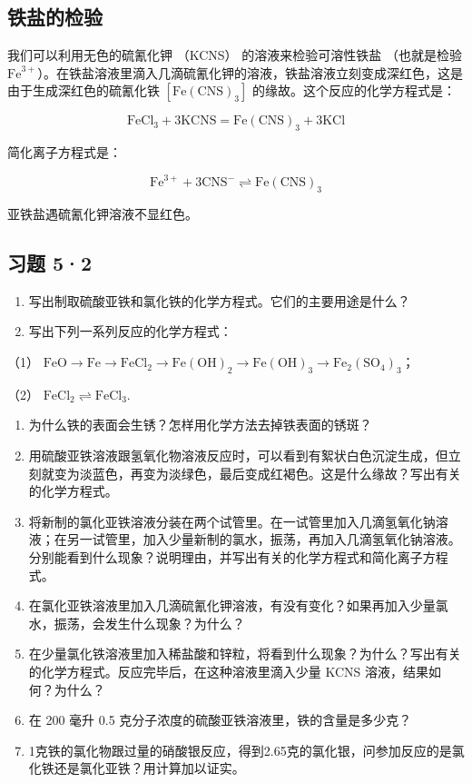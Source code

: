 \subsection{铁盐的检验}

我们可以利用无色的硫氰化钾 （KCNS） 的溶液来检验可溶性铁盐 （也就是检验
\(\mathrm{Fe}^{3+}\)）。在铁盐溶液里滴入几滴硫氰化钾的溶液，铁盐溶液立刻变成深红色，这是由于生成深红色的硫氰化铁
\(\left[\mathrm{Fe}(\mathrm{CNS})_{3}\right]\)
的缘故。这个反应的化学方程式是：

\[
\mathrm{FeCl} _ {3} + 3 \mathrm{KCNS} = \mathrm{Fe} (\mathrm{CNS}) _ {3} + 3 \mathrm{KCl}
\]

简化离子方程式是：

\[
\mathrm{Fe} ^{3+} + 3 \mathrm{CNS} ^ {-} \rightleftharpoons \mathrm{Fe} (\mathrm{CNS}) _ {3}
\]

亚铁盐遇硫氰化钾溶液不显红色。

\subsection{习题 5·2}

\begin{enumerate}
\item
  写出制取硫酸亚铁和氯化铁的化学方程式。它们的主要用途是什么？
\item
  写出下列一系列反应的化学方程式：
\end{enumerate}

（1）
\(\mathrm{FeO} \longrightarrow \mathrm{Fe} \longrightarrow \mathrm{FeCl}_2 \longrightarrow \mathrm{Fe(OH)}_2 \longrightarrow \mathrm{Fe(OH)}_3 \longrightarrow \mathrm{Fe}_2(\mathrm{SO}_4)_3\)；

（2） \(\mathrm{FeCl}_2 \rightleftharpoons \mathrm{FeCl}_3\).

\begin{enumerate}[start=3]
\item
  为什么铁的表面会生锈？怎样用化学方法去掉铁表面的锈斑？
\item
  用硫酸亚铁溶液跟氢氧化物溶液反应时，可以看到有絮状白色沉淀生成，但立刻就变为淡蓝色，再变为淡绿色，最后变成红褐色。这是什么缘故？写出有关的化学方程式。
\item
  将新制的氯化亚铁溶液分装在两个试管里。在一试管里加入几滴氢氧化钠溶液；在另一试管里，加入少量新制的氯水，振荡，再加入几滴氢氧化钠溶液。分别能看到什么现象？说明理由，并写出有关的化学方程式和简化离子方程式。
\item
  在氯化亚铁溶液里加入几滴硫氰化钾溶液，有没有变化？如果再加入少量氯水，振荡，会发生什么现象？为什么？
\item
  在少量氯化铁溶液里加入稀盐酸和锌粒，将看到什么现象？为什么？写出有关的化学方程式。反应完毕后，在这种溶液里滴入少量
  KCNS 溶液，结果如何？为什么？
\item
  在 200 毫升 0.5 克分子浓度的硫酸亚铁溶液里，铁的含量是多少克？
\item
  1克铁的氯化物跟过量的硝酸银反应，得到2.65克的氯化银，问参加反应的是氯化铁还是氯化亚铁？用计算加以证实。
\end{enumerate}

